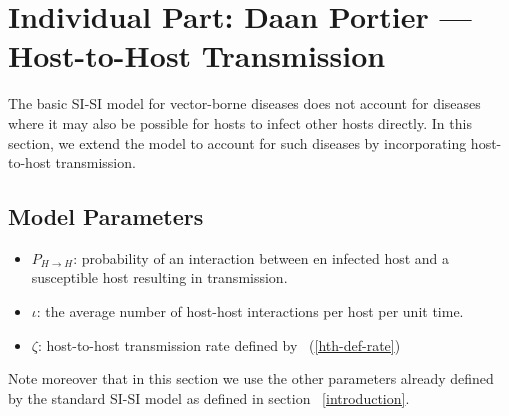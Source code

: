 \section{Individual Part: Daan Portier --- Host-to-Host Transmission}
The basic SI-SI model for vector-borne diseases does not account for diseases where it may also be possible for hosts to infect other hosts directly. In this section, we extend the model to account for such diseases by incorporating host-to-host transmission.

\subsection*{Model Parameters}
\begin{itemize}
    \item $P_{H \to H}$: probability of an interaction between en infected host and a susceptible host resulting in transmission.
    \item $\iota$: the average number of host-host interactions per host per unit time.
    \item $\zeta$: host-to-host transmission rate defined by ~(\ref{hth-def-rate})
\end{itemize}
Note moreover that in this section we use the other parameters already defined by the standard SI-SI model as defined in section ~\ref{introduction}.


